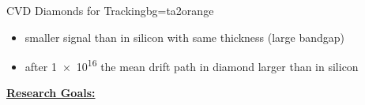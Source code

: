 \begin{variableblock}{CVD Diamonds for Tracking}{bg=ta2orange}{}
	\begin{itemize}
		\item smaller signal than in silicon with same thickness (large bandgap)
		\item after \SI{1e16}{\ncm} the mean drift path in diamond larger than in silicon
	\end{itemize}

	\textbf{\underline{Research Goals:}}\vspace*{1ex}
	\begin{itemize}
		\color{fg}
	\end{itemize}


\end{variableblock}
